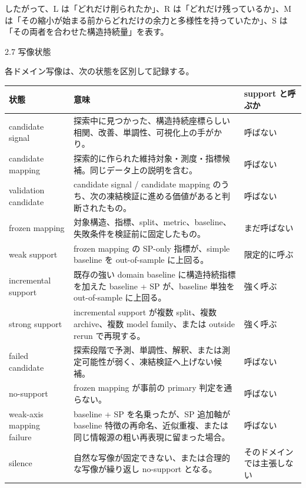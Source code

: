 \documentclass[12pt,a4paper]{article}
\begin{document}
したがって、L は「どれだけ削られたか」、R は「どれだけ残っているか」、M は「その縮小が始まる前からどれだけの余力と多様性を持っていたか」、S は「その両者を合わせた構造持続量」を表す。

2.7 写像状態

各ドメイン写像は、次の状態を区別して記録する。

{\def\LTcaptype{table} %
\begin{longtable}[]{@{}
  >{\raggedright\arraybackslash}p{}
  >{\raggedright\arraybackslash}p{}
  >{\raggedright\arraybackslash}p{}@{}}
\toprule\noalign{}
\begin{minipage}[b]{\linewidth}\raggedright
状態
\end{minipage} & \begin{minipage}[b]{\linewidth}\raggedright
意味
\end{minipage} & \begin{minipage}[b]{\linewidth}\raggedright
support と呼ぶか
\end{minipage} \\
\midrule\noalign{}
\endhead
\bottomrule\noalign{}
\endlastfoot
candidate signal & 探索中に見つかった、構造持続座標らしい相関、改善、単調性、可視化上の手がかり。 & 呼ばない \\
candidate mapping & 探索的に作られた維持対象・測度・指標候補。同じデータ上の説明を含む。 & 呼ばない \\
validation candidate & candidate signal / candidate mapping のうち、次の凍結検証に進める価値があると判断されたもの。 & 呼ばない \\
frozen mapping & 対象構造、指標、split、metric、baseline、失敗条件を検証前に固定したもの。 & まだ呼ばない \\
weak support & frozen mapping の SP-only 指標が、simple baseline を out-of-sample に上回る。 & 限定的に呼ぶ \\
incremental support & 既存の強い domain baseline に構造持続指標を加えた baseline + SP が、baseline 単独を out-of-sample に上回る。 & 強く呼ぶ \\
strong support & incremental support が複数 split、複数 archive、複数 model family、または outside rerun で再現する。 & 強く呼ぶ \\
failed candidate & 探索段階で予測、単調性、解釈、または測定可能性が弱く、凍結検証へ上げない候補。 & 呼ばない \\
no-support & frozen mapping が事前の primary 判定を通らない。 & 呼ばない \\
weak-axis mapping failure & baseline + SP を名乗ったが、SP 追加軸が baseline 特徴の再命名、近似重複、または同じ情報源の粗い再表現に留まった場合。 & 呼ばない \\
silence & 自然な写像が固定できない、または合理的な写像が繰り返し no-support となる。 & そのドメインでは主張しない \\
\end{longtable}
}
\end{document}
